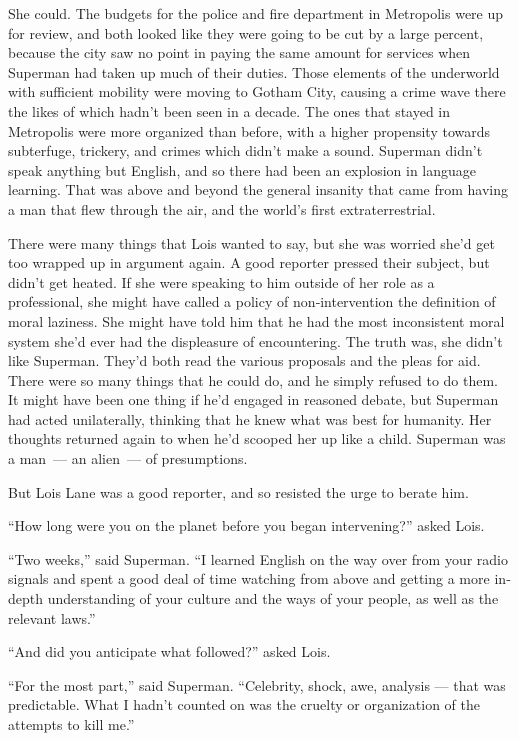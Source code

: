 She could. The budgets for the police and fire department in Metropolis
were up for review, and both looked like they were going to be cut by a
large percent, because the city saw no point in paying the same amount
for services when Superman had taken up much of their duties. Those
elements of the underworld with sufficient mobility were moving to
Gotham City, causing a crime wave there the likes of which hadn't been
seen in a decade. The ones that stayed in Metropolis were more organized
than before, with a higher propensity towards subterfuge, trickery, and
crimes which didn't make a sound. Superman didn't speak anything but
English, and so there had been an explosion in language learning. That
was above and beyond the general insanity that came from having a man
that flew through the air, and the world's first extraterrestrial.

There were many things that Lois wanted to say, but she was worried
she'd get too wrapped up in argument again. A good reporter pressed
their subject, but didn't get heated. If she were speaking to him
outside of her role as a professional, she might have called a policy of
non‐intervention the definition of moral laziness. She might have told
him that he had the most inconsistent moral system she'd ever had the
displeasure of encountering. The truth was, she didn't like Superman.
They'd both read the various proposals and the pleas for aid. There were
so many things that he could do, and he simply refused to do them. It
might have been one thing if he'd engaged in reasoned debate, but
Superman had acted unilaterally, thinking that he knew what was best for
humanity. Her thoughts returned again to when he'd scooped her up like a
child. Superman was a man~--- an alien~--- of presumptions.

But Lois Lane was a good reporter, and so resisted the urge to berate
him.

``How long were you on the planet before you began intervening?'' asked
Lois.

``Two weeks,'' said Superman. ``I learned English on the way over from
your radio signals and spent a good deal of time watching from above and
getting a more in‐depth understanding of your culture and the ways of
your people, as well as the relevant laws.''

``And did you anticipate what followed?'' asked Lois.

``For the most part,'' said Superman. ``Celebrity, shock, awe, analysis
--- that was predictable. What I hadn't counted on was the cruelty or
organization of the attempts to kill me.''

